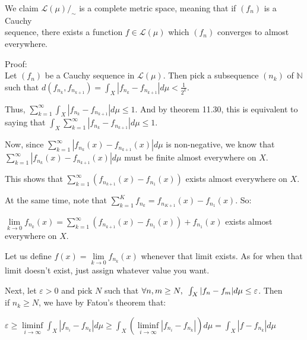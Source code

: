 \documentclass{book}
\newcommand{\exTwo}{%
   \color{RedViolet}%
   \fontsize{13}{15}\selectfont%
}
\newenvironment{myIndent}{%
   \begin{adjustwidth}{2.5em}{0em}%
}{%
   \end{adjustwidth}%
}
\newcommand{\myHS}{ \hspace{0.5em}}
\newcommand{\retTwo}{\hfill\bigbreak}
\begin{document}
We claim $\mathscr{L}(\mu)/_\sim$ is a complete metric space, meaning that if $(f_n)$ is a Cauchy\\ sequence, there exists a function $f \in \mathscr{L}(\mu)$ which $(f_n)$ converges to almost\\ everywhere.\\ [-6pt]

{\begin{myIndent}\exTwo
   Proof:\\
   Let $(f_n)$ be a Cauchy sequence in $\mathscr{L}(\mu)$. Then pick a subsequence $(n_k)$ of $\mathbb{N}$\\ such that $d(f_{n_k}, f_{n_{k+1}}) = \int_X |f_{n_k} - f_{n_{k+1}}|d\mu < \frac{1}{2^k}$.\retTwo

   Thus, $\sum\limits_{k=1}^\infty \int_X|f_{n_k} - f_{n_{k+1}}|d\mu \leq 1$. And by theorem 11.30, this is equivalent to\\ [-7pt] saying that $\int_X \sum\limits_{k=1}^\infty|f_{n_k} - f_{n_{k+1}}|d\mu \leq 1$.\retTwo

   Now, since $\sum\limits_{k=1}^\infty |f_{n_k}(x) - f_{n_{k+1}}(x)|d\mu$ is non-negative, we know that\\ [-8pt] $\sum\limits_{k=1}^\infty |f_{n_k}(x) - f_{n_{k+1}}(x)|d\mu$ must be finite almost everywhere on $X$.\retTwo

   This shows that $\sum\limits_{k=1}^\infty \left(f_{n_{k+1}}(x) - f_{n_{1}}(x)\right)$ exists almost everywhere on $X$.

   \newpage

   At the same time, note that $\sum\limits_{k=1}^K f_{n_k} = f_{n_{K+1}}(x) - f_{n_1}(x)$. So:\\ [-10pt]
   
   {\centering$\lim\limits_{k\rightarrow 0}f_{n_k}(x) = \sum\limits_{k=1}^\infty \left(f_{n_{k+1}}(x) - f_{n_{1}}(x)\right) + f_{n_1}(x)$ exists almost everywhere on $X$.\retTwo\par}

   Let us define $f(x) = \lim\limits_{k\rightarrow 0}f_{n_k}(x)$ whenever that limit exists. As for when that\\ limit doesn't exist, just assign whatever value you want.\retTwo

   Next, let $\varepsilon > 0$ and pick $N$ such that $\forall n, m \geq N, \myHS \int_X |f_n - f_m|d\mu \leq \varepsilon$. Then\\ if $n_k \geq N$, we have by Fatou's theorem that:
   
   {\centering $\varepsilon \geq \liminf\limits_{i\rightarrow \infty} \int_X |f_{n_i} - f_{n_k}|d\mu \geq \int_X \left(\liminf\limits_{i\rightarrow \infty} |f_{n_i} - f_{n_k}|\right)d\mu = \int_X |f - f_{n_k}|d\mu$ \retTwo\par} 


\end{myIndent}}
\end{document}
